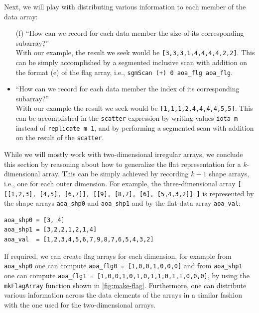 \documentclass[acmsmall,review]{acmart}\settopmatter{printfolios=true,printccs=false,printacmref=false}
\begin{document}
Next, we will play with distributing various information
to each member of the data array:
\begin{itemize}
    \item[(f)] ``How can we record for each
                 data member the size of its corresponding subarray?''\\
                With our example, the result we seek would be
                {\tt[3,3,3,1,4,4,4,4,2,2]}. This can be simply
                accomplished by a segmented inclusive scan with addition
                on the format (e) of the flag array, i.e.,
                \lstinline{sgmScan (+) 0 aoa_flg aoa_flg}.
   \item[(g)] ``How can we record for each
                 data member the index of its corresponding subarray?''\\
                With our example the result we seek would be
                {\tt[1,1,1,2,4,4,4,4,5,5]}. This can be accomplished
                in the \lstinline{scatter} expression by writing values 
                {\tt iota m} instead of \lstinline{replicate m 1},
                and by performing a segmented scan with addition on 
                the result of the \lstinline{scatter}.
\end{itemize}

While we will mostly work with two-dimensional irregular arrays, 
we conclude this section by reasoning about how to generalize 
the flat representation for a $k$-dimensional array. This 
can be simply achieved by recording $k-1$ shape arrays,
i.e., one for each outer dimension.
For example, the three-dimensional array
{\tt [ [[1,2,3], [4,5], [6,7]], [[9], [8,7], [6], [5,4,3,2]] ]}
is represented by the shape arrays {\tt aoa\_shp0} and
{\tt aoa\_shp1} and by the flat-data array {\tt aoa\_val}:
\begin{lstlisting}[mathescape=true]
aoa_shp0 = [3, 4]
aoa_shp1 = [3,2,2,1,2,1,4]
aoa_val  = [1,2,3,4,5,6,7,9,8,7,6,5,4,3,2]
\end{lstlisting}\vspace{-2ex}
If required, we can create flag arrays for each dimension,
for example from {\tt aoa\_shp0} one can compute
{\tt aoa\_flg0 = [1,0,0,1,0,0,0]} and from {\tt aoa\_shp1}
one can compute {\tt aoa\_flg1 = [1,0,0,1,0,1,0,1,1,0,1,1,0,0,0]},
by using the {\tt mkFlagArray} function shown in \cref{fig:make-flag}.
Furthermore, one can distribute various information across the 
data elements of the arrays in a similar fashion with the one 
used for the two-dimensional arrays.   
\end{document}
